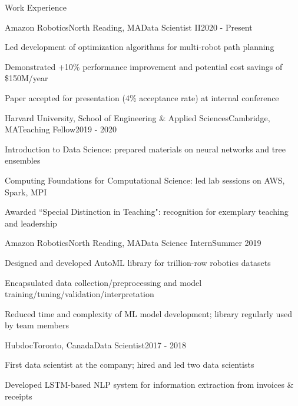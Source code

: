 \documentclass{resume} %
\begin{document}
\begin{rSection}{Work Experience}

\begin{rSubsection}{Amazon Robotics}{North Reading, MA}{Data Scientist II}{2020 - Present}
	\item Led development of optimization algorithms for multi-robot path planning
	\item Demonstrated +10\% performance improvement and potential cost savings of \$150M/year
	\item Paper accepted for presentation (4\% acceptance rate) at internal conference 
\end{rSubsection}
\begin{rSubsection}{Harvard University, School of Engineering \& Applied Sciences}{Cambridge, MA}{Teaching Fellow}{2019 - 2020}
	\item Introduction to Data Science: prepared materials on neural networks and tree ensembles
	\item Computing Foundations for Computational Science: led lab sessions on AWS, Spark, MPI
	\item Awarded ``Special Distinction in Teaching": recognition for exemplary teaching and leadership
\end{rSubsection}
\begin{rSubsection}{Amazon Robotics}{North Reading, MA}{Data Science Intern}{Summer 2019}
	\item Designed and developed AutoML library for trillion-row robotics datasets
	\item Encapsulated data collection/preprocessing and model training/tuning/validation/interpretation
	\item Reduced time and complexity of ML model development; library regularly used by team members
\end{rSubsection}
\begin{rSubsection}{Hubdoc}{Toronto, Canada}{Data Scientist}{2017 - 2018}
	\item First data scientist at the company; hired and led two data scientists
	\item Developed LSTM-based NLP system for information extraction from invoices \& receipts

\end{rSubsection}
\end{rSection}
\end{document}
